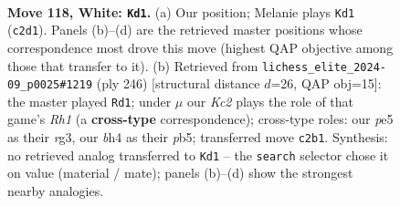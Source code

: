 \documentclass[11pt]{article}
\begin{document}
\clearpage

\begin{figure}[p]\centering
\begin{subfigure}{0.46\textwidth}\centering
\resizebox{\linewidth}{!}{%
\newchessgame
\chessboard[
  setfen={1R3n2/8/8/3rp2p/6kb/8/2Kp4/8 w - - 0 118},
  showmover=false,
  pgfstyle=straightmove, color=movearrow, markmove={c2-d1}
]}
\caption{}
\end{subfigure}\hfill
\begin{subfigure}{0.46\textwidth}\centering
\resizebox{\linewidth}{!}{%
\newchessgame
\chessboard[
  setfen={8/5k2/5p2/1p3p2/1P6/6r1/5r1p/1K5R w - - 6 124},
  showmover=false,
  pgfstyle=straightmove, color=movearrow, markmove={h1-d1}
]}
\caption{}
\end{subfigure}
\\[4pt]

\caption{\textbf{Move 118, White: \texttt{Kd1}.} (a) Our position; Melanie plays \texttt{Kd1} (\texttt{c2d1}). Panels (b)--(d) are the retrieved master positions whose correspondence most drove this move (highest QAP objective among those that transfer to it). (b) Retrieved from \texttt{lichess\_elite\_2024-09\_p0025\#1219} (ply 246) [structural distance $d$=26, QAP obj=15]: the master played \texttt{Rd1}; under $\mu$ our \emph{Kc2} plays the role of that game's \emph{Rh1} (a \textbf{cross-type} correspondence); cross-type roles: our \emph{p}e5 as their \emph{r}g3, our \emph{b}h4 as their \emph{p}b5; transferred move \texttt{c2b1}. Synthesis: no retrieved analog transferred to \texttt{Kd1} -- the \texttt{search} selector chose it on value (material / mate); panels (b)--(d) show the strongest nearby analogies.}
\label{fig:thought-m234}
\end{figure}

\clearpage
\end{document}
